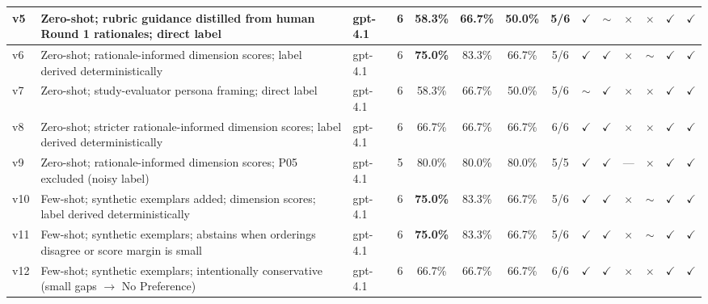 \begin{table}[htbp]
{\begin{tabular}{|l|l|l|c|c|c|c|c|c|c|c|c|c|c|}
\hline
v5            & Zero-shot; rubric guidance distilled from human Round 1 rationales; direct label  & gpt-4.1          & 6 & 58.3\%          & 66.7\% & 50.0\% & 5/6   & $\checkmark$ & $\sim$       & $\times$ & $\times$     & $\checkmark$ & $\checkmark$ \\
\hline
v6            & Zero-shot; rationale-informed dimension scores; label derived deterministically    & gpt-4.1          & 6 & \textbf{75.0\%} & 83.3\% & 66.7\% & 5/6   & $\checkmark$ & $\checkmark$ & $\times$ & $\sim$       & $\checkmark$ & $\checkmark$ \\
\hline
v7            & Zero-shot; study-evaluator persona framing; direct label                          & gpt-4.1          & 6 & 58.3\%          & 66.7\% & 50.0\% & 5/6   & $\sim$       & $\checkmark$ & $\times$ & $\times$     & $\checkmark$ & $\checkmark$ \\
\hline
v8            & Zero-shot; stricter rationale-informed dimension scores; label derived deterministically & gpt-4.1   & 6 & 66.7\%          & 66.7\% & 66.7\% & 6/6   & $\checkmark$ & $\checkmark$ & $\times$ & $\times$     & $\checkmark$ & $\checkmark$ \\
\hline
v9            & Zero-shot; rationale-informed dimension scores; P05 excluded (noisy label)        & gpt-4.1          & 5 & 80.0\%          & 80.0\% & 80.0\% & 5/5   & $\checkmark$ & $\checkmark$ & ---      & $\times$     & $\checkmark$ & $\checkmark$ \\
\hline
v10           & Few-shot; synthetic exemplars added; dimension scores; label derived deterministically & gpt-4.1    & 6 & \textbf{75.0\%} & 83.3\% & 66.7\% & 5/6   & $\checkmark$ & $\checkmark$ & $\times$ & $\sim$       & $\checkmark$ & $\checkmark$ \\
\hline
v11           & Few-shot; synthetic exemplars; abstains when orderings disagree or score margin is small & gpt-4.1 & 6 & \textbf{75.0\%} & 83.3\% & 66.7\% & 5/6   & $\checkmark$ & $\checkmark$ & $\times$ & $\sim$       & $\checkmark$ & $\checkmark$ \\
\hline
v12           & Few-shot; synthetic exemplars; intentionally conservative (small gaps $\to$ No Preference) & gpt-4.1 & 6 & 66.7\%        & 66.7\% & 66.7\% & 6/6   & $\checkmark$ & $\checkmark$ & $\times$ & $\times$     & $\checkmark$ & $\checkmark$ \\
\hline
\end{tabular}}
\end{table}
